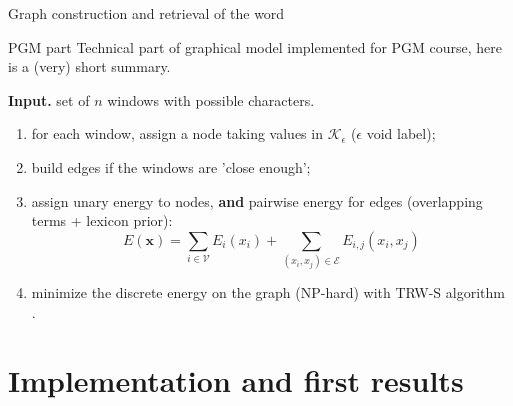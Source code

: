 \documentclass[handout]{beamer}
\begin{document}
\begin{frame}{Graph construction and retrieval of the word}
\begin{alertblock}{PGM part}
Technical part of graphical model implemented for PGM course, here is a (very) short summary.
\end{alertblock}
\textbf{Input. } set of $n$ windows with possible characters.
\begin{enumerate}
	\item for each window, assign a node taking values in $\mathcal{K}_{\epsilon}$ ($\epsilon$ void label);
	\item build edges if the windows are 'close enough';
	\item assign unary energy to nodes, \textbf{and} pairwise energy for edges (overlapping terms + lexicon prior):
	\begin{equation}
	E(\mathbf{x}) = \sum_{i\in \mathcal{V}} E_i(x_i) + \sum_{(x_i,x_j)\in\mathcal{E}} E_{i,j}(x_i,x_j)
	\label{eq:}
	\end{equation}
	\item minimize the discrete energy on the graph (NP-hard) with TRW-S algorithm \cite{Kol}.
\end{enumerate}

\end{frame}




\section{Implementation and first results}

\end{document}
